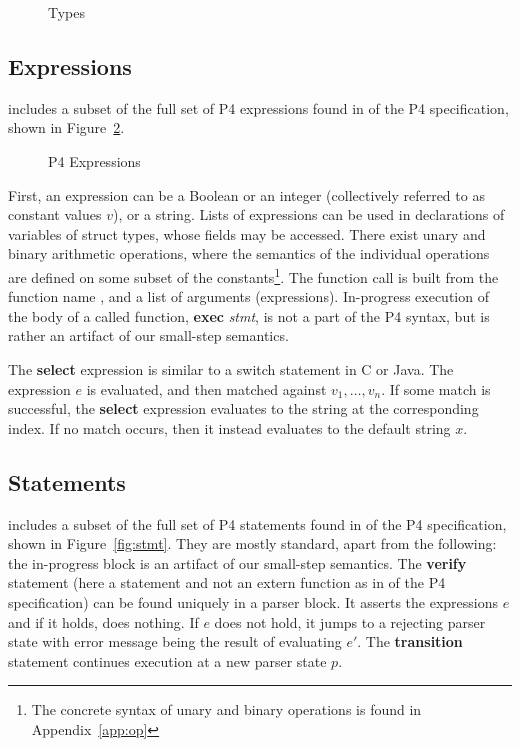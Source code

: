 \documentclass[UTF8]{article}
\begin{document}
\begin{figure}[h!]
\centering\ottgrammartabular{
\ottbt\ottinterrule
\ottt\ottinterrule
}
\caption{Types}
\label{fig:types}
\end{figure}

\newpage
\subsection{Expressions}
\newcommand{\fmap}{\textit{F}}

\pfott{} includes a subset of the full set of P4 expressions found in {} of the P4 specification, shown in Figure~\ref{fig:exp}.

\begin{figure}[h!]
\centering\ottgrammartabular{
\otte\ottafterlastrule
}
\caption{P4 Expressions}
\label{fig:exp}
\end{figure}
\newcommand{\stmt}{\textit{stmt}}
\newcommand{\cval}{\ensuremath{v}}
\newcommand{\fexec}[1]{\textbf{exec}\,\,#1}

First, an expression can be a Boolean or an integer (collectively referred to as constant values \cval{}), or a string. Lists of expressions can be used in declarations of variables of struct types, whose fields may be accessed. There exist unary and binary arithmetic operations, where the semantics of the individual operations are defined on some subset of the constants\footnote{The concrete syntax of unary and binary operations is found in Appendix~\ref{app:op}}. The function call is built from the function name \fn{}, and a list of arguments (expressions). In-progress execution of the body of a called function, \fexec{\stmt{}}, is not a part of the P4 syntax, but is rather an artifact of our small-step semantics.

The \textbf{select} expression is similar to a switch statement in C or Java. The expression $e$ is evaluated, and then matched against $v_1 , \ldots , v_n$. If some match is successful, the \textbf{select} expression evaluates to the string at the corresponding index. If no match occurs, then it instead evaluates to the default string $x$.

\newpage
\subsection{Statements}

\label{ssec:stmt}
\pfott{} includes a subset of the full set of P4 statements found in  of the P4 specification, shown in Figure~\ref{fig:stmt}. They are mostly standard, apart from the following: the in-progress block is an artifact of our small-step semantics. The \textbf{verify} statement (here a statement and not an extern function as in  of the P4 specification) can be found uniquely in a parser block. It asserts the expressions $e$ and if it holds, does nothing. If $e$ does not hold, it jumps to a rejecting parser state with error message being the result of evaluating $e'$. The \textbf{transition} statement continues execution at a new parser state $p$.
\end{document}
